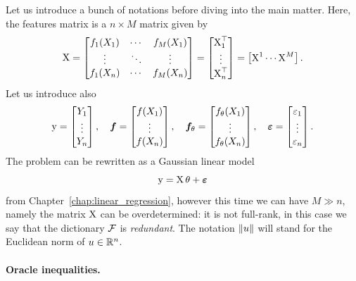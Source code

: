 Let us introduce a bunch of notations before diving into the main matter.
Here, the features matrix is a $n \times M$ matrix given by
\begin{equation*}
	\operatorname{{\boldsymbol X}} = 
	\begin{bmatrix}
		f_1(X_1) & \cdots & f_M(X_1) \\
		\vdots & \ddots & \vdots \\
		f_1(X_n) & \cdots & f_M(X_n)
	\end{bmatrix}	
	=
	\begin{bmatrix}
		\operatorname{{\boldsymbol X}}_1^\top \\
		\vdots \\
		\operatorname{{\boldsymbol X}}_n^\top 
	\end{bmatrix}
	= 
	\begin{bmatrix}
		\operatorname{{\boldsymbol X}}^1 \cdots \operatorname{{\boldsymbol X}}^M
	\end{bmatrix}.
\end{equation*}
Let us introduce also
\begin{equation*}
	\operatorname{{\boldsymbol y}} =
	\begin{bmatrix}
		Y_1 \\
		\vdots \\
		Y_n
	\end{bmatrix},
	\quad
	{\boldsymbol f} = 
	\begin{bmatrix}
		f(X_1) \\
		\vdots \\
		f(X_n)
	\end{bmatrix},
	\quad
	{\boldsymbol f}_\theta =	
	\begin{bmatrix}
		f_\theta(X_1) \\
		\vdots \\
		f_\theta(X_n)
	\end{bmatrix},
	\quad
	\operatorname{\boldsymbol \varepsilon} = 
	\begin{bmatrix}
		\varepsilon_1 \\
		\vdots \\
		\varepsilon_n
	\end{bmatrix}.
\end{equation*}
The problem can be rewritten as a Gaussian linear model
\begin{equation*}
	\operatorname{{\boldsymbol y}} = \operatorname{{\boldsymbol X}} \theta + \operatorname{\boldsymbol \varepsilon}
\end{equation*}
from Chapter~\ref{chap:linear_regression}, however this time we can have $M \gg n$, namely the matrix $\operatorname{{\boldsymbol X}}$ can be overdetermined: it is not full-rank, in this case we say that the dictionary $\operatorname{{\mathcal F}}$ is \emph{redundant}.
The notation $\| u \|$ will stand for the Euclidean norm of $u \in \mathbb R^n$.

\paragraph{Oracle inequalities.}

